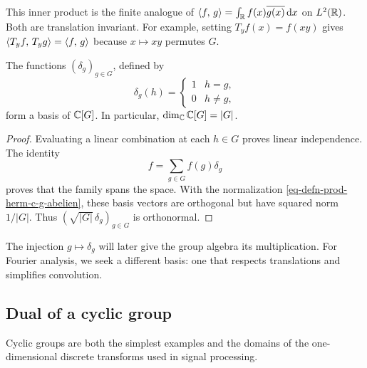 \begin{rem}
\label{notation-11}
This inner product is the finite analogue of
$\langle f,\,g\rangle=\int_{\mathbb{R}}f(x)\overline{g(x)}\,\mathrm{d} x$ on $L^2(\mathbb{R})$.
Both are translation invariant. For example, setting
$T_yf(x)=f(xy)$ gives
$\langle T_yf,\,T_yg\rangle=\langle f,\,g\rangle$ because $x\mapsto xy$ permutes $G$.
\end{rem}


\begin{prop}
\label{prop-base-c-g}
The functions $(\delta_g)_{g\in G}$, defined by
\begin{equation}
\label{eq-defn-delta-function-g}
 \delta_g(h)=\begin{cases}1&h=g,\\0&h\neq g,\end{cases}
\end{equation}
form a basis of $\mathbb{C}[G]$. In particular, $\dim_{\mathbb{C}}\mathbb{C}[G]=|G|$.
\end{prop}
\begin{proof}
Evaluating a linear combination at each $h\in G$ proves linear independence.
The identity
\begin{equation}
\label{eq-decomposition-c-g-dirac-abelien}
 f=\sum_{g\in G}f(g)\delta_g
\end{equation}
proves that the family spans the space. With the normalization
\eqref{eq-defn-prod-herm-c-g-abelien}, these basis vectors are orthogonal but
have squared norm $1/|G|$. Thus $(\sqrt{|G|}\,\delta_g)_{g\in G}$ is orthonormal.
\end{proof}
The injection $g\mapsto\delta_g$ will later give the group algebra its
multiplication. For Fourier analysis, we seek a different basis: one that
respects translations and simplifies convolution.

\subsection{Dual of a cyclic group}
\label{sect1-dual-cyclic-group}
Cyclic groups are both the simplest examples and the domains of the
one-dimensional discrete transforms used in signal processing.


